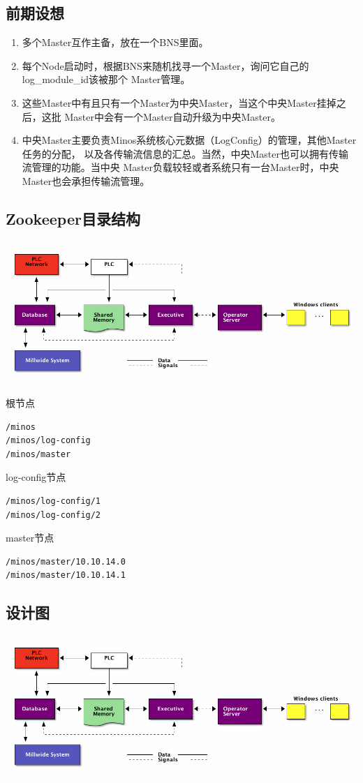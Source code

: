 \documentclass[11pt]{article}
\begin{document}
\subsection{前期设想}
\label{sec-8-1}
\begin{enumerate}
\item 多个Master互作主备，放在一个BNS里面。
\item 每个Node启动时，根据BNS来随机找寻一个Master，询问它自己的log\_module\_id该被那个
Master管理。
\item 这些Master中有且只有一个Master为中央Master，当这个中央Master挂掉之后，这批
Master中会有一个Master自动升级为中央Master。
\item 中央Master主要负责Minos系统核心元数据（LogConfig）的管理，其他Master任务的分配，
以及各传输流信息的汇总。当然，中央Master也可以拥有传输流管理的功能。当中央
Master负载较轻或者系统只有一台Master时，中央Master也会承担传输流管理。
\end{enumerate}
\subsection{Zookeeper目录结构}
\label{sec-8-2}

\includegraphics[width=.9\linewidth]{some_filename.png}

根节点
\begin{verbatim}
/minos
/minos/log-config
/minos/master
\end{verbatim}

log-config节点
\begin{verbatim}
/minos/log-config/1
/minos/log-config/2
\end{verbatim}

master节点
\begin{verbatim}
/minos/master/10.10.14.0
/minos/master/10.10.14.1
\end{verbatim}
\subsection{设计图}
\label{sec-8-3}

\includegraphics[width=.9\linewidth]{some_filename.png}
\end{document}
